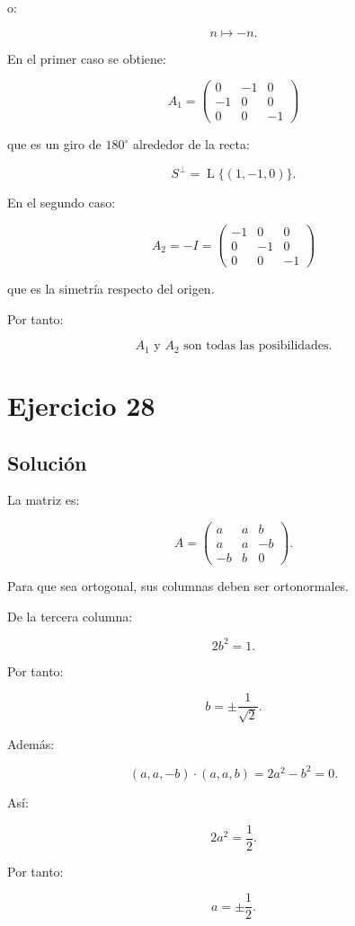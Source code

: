 \documentclass[11pt,a4paper]{article}
\newcommand{\Span}{\operatorname{L}}
\begin{document}
o:

\[
n\mapsto-n.
\]

En el primer caso se obtiene:

\[
\boxed{
A_1=
\begin{pmatrix}
0&-1&0\\
-1&0&0\\
0&0&-1
\end{pmatrix}
}
\]

que es un giro de \(180^\circ\) alrededor de la recta:

\[
S^\perp
=
\Span\{(1,-1,0)\}.
\]

En el segundo caso:

\[
\boxed{
A_2=-I
=
\begin{pmatrix}
-1&0&0\\
0&-1&0\\
0&0&-1
\end{pmatrix}
}
\]

que es la simetría respecto del origen.

Por tanto:

\[
\boxed{
A_1
\text{ y }
A_2
\text{ son todas las posibilidades.}
}
\]

\section{Ejercicio 28}
\subsection{Solución}

La matriz es:

\[
A=
\begin{pmatrix}
a&a&b\\
a&a&-b\\
-b&b&0
\end{pmatrix}.
\]

Para que sea ortogonal, sus columnas deben ser ortonormales.

De la tercera columna:

\[
2b^2=1.
\]

Por tanto:

\[
b=\pm\frac1{\sqrt2}.
\]

Además:

\[
( a,a,-b)\cdot(a,a,b)
=
2a^2-b^2
=
0.
\]

Así:

\[
2a^2=\frac12.
\]

Por tanto:

\[
a=\pm\frac12.
\]
\end{document}
